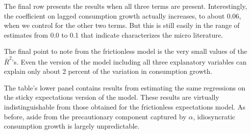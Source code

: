 \documentclass[titlepage]{\econtex}\newcommand{\texname}{cAndCwithStickyE}
\begin{document}
The final row presents the results when all three terms are present.  Interestingly, the coefficient on lagged consumption growth actually increases, to about 0.06, when we control for the other two terms.  But this is still easily in the range of estimates from 0.0 to 0.1 that \cite{hrsHabit} indicate characterizes the micro literature.

The final point to note from the frictionless model is the very small values of the $\bar{R}^{2}$'s.  Even the version of the model including all three explanatory variables can explain only about 2 percent of the variation in consumption growth.

The table's lower panel contains results from estimating the same regressions on the sticky expectations version of the model.  These results are virtually indistinguishable from those obtained for the frictionless expectations model.  As before, aside from the precautionary component captured by $\alpha$, idiosyncratic consumption growth is largely unpredictable.

\end{document}
